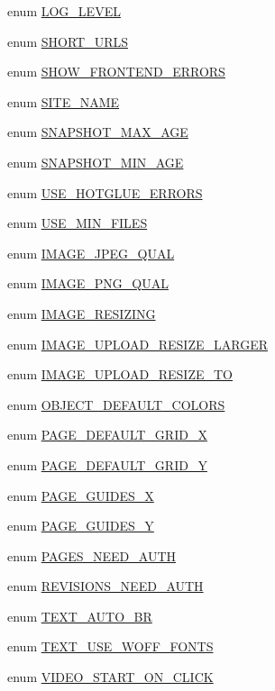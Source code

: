 \begin{DoxyCompactItemize}
\item 
enum \hyperlink{config_8inc_8php_aa5a9053636a30269210c54e734e0d583}{LOG\_\-LEVEL} 
\item 
enum \hyperlink{config_8inc_8php_a377ac3321785e25215435e8d9802bc34}{SHORT\_\-URLS} 
\item 
enum \hyperlink{config_8inc_8php_a71022f94adb600e3984795805fe7f8d0}{SHOW\_\-FRONTEND\_\-ERRORS} 
\item 
enum \hyperlink{config_8inc_8php_a38f8e1265350d7091b55f4cffe629f3a}{SITE\_\-NAME} 
\item 
enum \hyperlink{config_8inc_8php_aa9c8d739795b1000f6ea105992a4e488}{SNAPSHOT\_\-MAX\_\-AGE} 
\item 
enum \hyperlink{config_8inc_8php_a7fb94ff6aaa61e964fe2f90f738d5cb3}{SNAPSHOT\_\-MIN\_\-AGE} 
\item 
enum \hyperlink{config_8inc_8php_a4be2ca4abd0486feb76708f3cf7e671d}{USE\_\-HOTGLUE\_\-ERRORS} 
\item 
enum \hyperlink{config_8inc_8php_a98806af9de0ea41a958d26c7e06b26a9}{USE\_\-MIN\_\-FILES} 
\item 
enum \hyperlink{config_8inc_8php_af27e0280ef96e9b1d2d968a0d2d208ff}{IMAGE\_\-JPEG\_\-QUAL} 
\item 
enum \hyperlink{config_8inc_8php_a3e161cc5c717f2e23d89b69ec297af9b}{IMAGE\_\-PNG\_\-QUAL} 
\item 
enum \hyperlink{config_8inc_8php_a0654894e46ca07417a6e85e091ed7d1d}{IMAGE\_\-RESIZING} 
\item 
enum \hyperlink{config_8inc_8php_a009a803b2fcec74eb8fd6b90dfebd680}{IMAGE\_\-UPLOAD\_\-RESIZE\_\-LARGER} 
\item 
enum \hyperlink{config_8inc_8php_a86484d4f8051155268e7c23ac4d1f5f4}{IMAGE\_\-UPLOAD\_\-RESIZE\_\-TO} 
\item 
enum \hyperlink{config_8inc_8php_a3e205a45d91d7ef191e53487b6b48b3b}{OBJECT\_\-DEFAULT\_\-COLORS} 
\item 
enum \hyperlink{config_8inc_8php_abc1c54acdbce897c718854b663517cf9}{PAGE\_\-DEFAULT\_\-GRID\_\-X} 
\item 
enum \hyperlink{config_8inc_8php_ab93c5dcea5ef58747b80594c3d9304d7}{PAGE\_\-DEFAULT\_\-GRID\_\-Y} 
\item 
enum \hyperlink{config_8inc_8php_a81167deb206874270a59273141919fe5}{PAGE\_\-GUIDES\_\-X} 
\item 
enum \hyperlink{config_8inc_8php_a3f78eb981e05f649bfff403c0e595d0b}{PAGE\_\-GUIDES\_\-Y} 
\item 
enum \hyperlink{config_8inc_8php_a11f5534165e1764860b16cc7215b2141}{PAGES\_\-NEED\_\-AUTH} 
\item 
enum \hyperlink{config_8inc_8php_a67b9479d334a4e6c33c0bc3505b3eb5e}{REVISIONS\_\-NEED\_\-AUTH} 
\item 
enum \hyperlink{config_8inc_8php_a6f581226f389510394c592491ebedc0b}{TEXT\_\-AUTO\_\-BR} 
\item 
enum \hyperlink{config_8inc_8php_aca83853e44d4952801b133bf687a1056}{TEXT\_\-USE\_\-WOFF\_\-FONTS} 
\item 
enum \hyperlink{config_8inc_8php_ae1e42e1baa41f003453356a3747f9fee}{VIDEO\_\-START\_\-ON\_\-CLICK} 
\end{DoxyCompactItemize}
